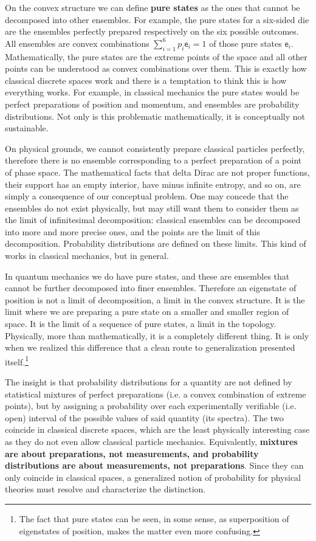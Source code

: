 \documentclass[10pt,twocolumn, nofootinbib]{revtex4-2}
\newcommand{\ens}[1][e] {\mathsf{#1}} %
\begin{document}
On the convex structure we can define \textbf{pure states} as the ones that cannot be decomposed into other ensembles. For example, the pure states for a six-sided die are the ensembles perfectly prepared respectively on the six possible outcomes. All ensembles are convex combinations $\sum_{i=1}^{6} p_i \ens_i = 1$ of those pure states $\ens_i$. Mathematically, the pure states are the extreme points of the space and all other points can be understood as convex combinations over them. This is exactly how classical discrete spaces work and there is a temptation to think this is how everything works. For example, in classical mechanics the pure states would be perfect preparations of position and momentum, and ensembles are probability distributions. Not only is this problematic mathematically, it is conceptually not sustainable.

On physical grounds, we cannot consistently prepare classical particles perfectly, therefore there is no ensemble corresponding to a perfect preparation of a point of phase space. The mathematical facts that delta Dirac are not proper functions, their support has an empty interior, have minus infinite entropy, and so on, are simply a consequence of our conceptual problem. One may concede that the ensembles do not exist physically, but may still want them to consider them as the limit of infinitesimal decomposition: classical ensembles can be decomposed into more and more precise ones, and the points are the limit of this decomposition. Probability distributions are defined on these limits. This kind of works in classical mechanics, but in general.

In quantum mechanics we do have pure states, and these are ensembles that cannot be further decomposed into finer ensembles. Therefore an eigenstate of position is not a limit of decomposition, a limit in the convex structure. It is the limit where we are preparing a pure state on a smaller and smaller region of space. It is the limit of a sequence of pure states, a limit in the topology. Physically, more than mathematically, it is a completely different thing. It is only when we realized this difference that a clean route to generalization presented itself.\footnote{The fact that pure states can be seen, in some sense, as superposition of eigenstates of position, makes the matter even more confusing.}

The insight is that probability distributions for a quantity are not defined by statistical mixtures of perfect preparations (i.e. a convex combination of extreme points), but by assigning a probability over each experimentally verifiable (i.e. open) interval of the possible values of said quantity (its spectra). The two coincide in classical discrete spaces, which are the least physically interesting case as they do not even allow classical particle mechanics. Equivalently, \textbf{mixtures are about preparations, not measurements, and probability distributions are about measurements, not preparations}. Since they can only coincide in classical spaces, a generalized notion of probability for physical theories must resolve and characterize the distinction.
\end{document}
